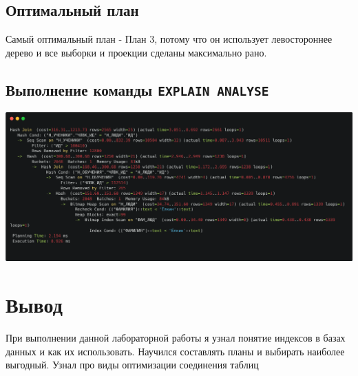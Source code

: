 \documentclass[12pt]{article}
\begin{document}
	\subsection{Оптимальный план}
	Самый оптимальный план - План 3, потому что он использует левостороннее дерево и все выборки и проекции сделаны максимально рано.
	\subsection{Выполнение команды \texttt{EXPLAIN ANALYSE}}
	\includegraphics[width=\linewidth]{explain2}
	\newpage
	\section{Вывод}
	При выполнении данной лабораторной работы я узнал понятие индексов в базах данных и как их использовать. Научился составлять планы и выбирать наиболее выгодный. Узнал про виды оптимизации соединения таблиц
\end{document}
